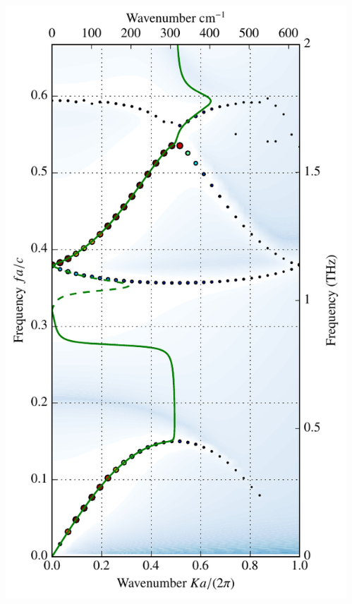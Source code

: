 \documentclass[t]{beamer} \usepackage[english]{babel} \usepackage[utf8]{inputenc} \usetheme{Frankfurt} %
\begin{document}
\begin{frame}[plain]{}
\begin{columns}[T]
\begin{column}{.55\textwidth}
	\end{column}%
	\begin{column}{.45\textwidth}
		\vspace{-1mm}\includegraphics[height=\paperheight]{../img-cdh-new/CDH_RodArray.pdf} 
	\end{column}
\end{columns}
\end{frame} 		%
\end{document}

